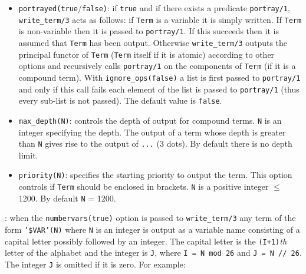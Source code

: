 \begin{itemize}
\item {}\texttt{portrayed(true}/\texttt{false)}: if \texttt{true}
and if there exists a predicate \texttt{portray/1}, \texttt{write\_term/3}
acts as follows: if \texttt{Term} is a variable it is simply written. If
\texttt{Term} is non-variable then it is passed to \texttt{portray/1}. If
this succeeds then it is assumed that \texttt{Term} has been output.
Otherwise \texttt{write\_term/3} outputs the principal functor of
\texttt{Term} (\texttt{Term} itself if it is atomic) according to other
options and recursively calls \texttt{portray/1} on the components of
\texttt{Term} (if it is a compound term). With \texttt{ignore\_ops(false)} a
list is first passed to \texttt{portray/1} and only if this call fails each
element of the list is passed to \texttt{portray/1} (thus every sub-list is
not passed). The default value is \texttt{false}.

\item {}\texttt{max\_depth(N)}: controls the depth of output for
compound terms. \texttt{N} is an integer specifying the depth. The output of
a term whose depth is greater than \texttt{N} gives rise to the output of
\texttt{...} (3 dots). By default there is no depth limit.

\item {}\texttt{priority(N)}: specifies the starting priority
to output the term. This option controls if \texttt{Term} should be enclosed
in brackets. \texttt{N} is a positive integer $\leq$ 1200. By default
\texttt{N} = 1200.

\end{itemize}

: when the \texttt{numbervars(true)} option is
passed to \texttt{write\_term/3} any term of the form \texttt{'\$VAR'(N)}
where \texttt{N} is an integer is output as a variable name consisting of a
capital letter possibly followed by an integer. The capital letter is the
\texttt{(I+1)}\emph{th} letter of the alphabet and the integer is
\texttt{J}, where \texttt{I = N mod 26} and \texttt{J = N // 26}. The
integer \texttt{J} is omitted if it is zero. For example:

\begin{CodeTwoCols}[2cm]
\end{CodeTwoCols}

